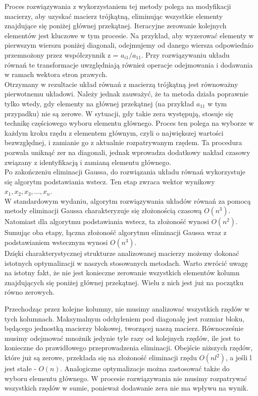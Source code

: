 \documentclass{article}
\begin{document}
	Proces rozwiązywania z wykorzystaniem tej metody polega na modyfikacji macierzy, aby uzyskać macierz trójkątną, eliminując wszystkie elementy znajdujące się poniżej głównej przekątnej. Iteracyjne zerowanie kolejnych elementów jest kluczowe w tym procesie. Na przykład, aby wyzerować elementy w pierwszym wierszu poniżej diagonali, odejmujemy od danego wiersza odpowiednio przemnożony przez współczynnik z = $a_{i1}/a_{11}$. Przy rozwiązywaniu układu równań te transformacje uwzględniają również operacje odejmowania i dodawania w ramach wektora stron prawych.\\

	Otrzymany w rezultacie układ równań z macierzą trójkątną jest równoważny pierwotnemu układowi. Należy jednak zauważyć, że ta metoda działa poprawnie tylko wtedy, gdy elementy na głównej przekątnej (na przykład $a_{11}$ w tym przypadku) nie są zerowe. W sytuacji, gdy takie zera występują, stosuje się technikę częściowego wyboru elementu głównego. Proces ten polega na wyborze w każdym kroku rzędu z elementem głównym, czyli o największej wartości bezwzględnej, i zamianie go z aktualnie rozpatrywanym rzędem. Ta procedura pozwala uniknąć zer na diagonali, jednak wprowadza dodatkowy nakład czasowy związany z identyfikacją i zamianą elementu głównego.\\

	Po zakończeniu eliminacji Gaussa, do rozwiązania układu równań wykorzystuje się algorytm podstawiania wstecz. Ten etap zwraca wektor wynikowy $x_1, x_2, x_3, ..., x_n$.\\

	W standardowym wydaniu, algorytm rozwiązywania układów równań za pomocą metody eliminacji Gaussa charakteryzuje się złożonością czasową $O(n^3)$. Natomiast dla algorytmu podstawiania wstecz, ta złożoność wynosi $O(n^2)$. Sumując oba etapy, łączna złożoność algorytmu eliminacji Gaussa wraz z podstawianiem wstecznym wynosi $O(n^3)$.\\

	Dzięki charakterystycznej strukturze analizowanej macierzy możemy dokonać istotnych optymalizacji w naszych stosowanych metodach. Warto zwrócić uwagę na istotny fakt, że nie jest konieczne zerowanie wszystkich elementów kolumn znajdujących się poniżej głównej przekątnej. Wielu z nich jest już na początku równo zerowych.

	Przechodząc przez kolejne kolumny, nie musimy analizować wszystkich rzędów w tych kolumnach. Maksymalnym odchyleniem pod diagonalę jest rozmiar bloku, będącego jednostką macierzy blokowej, tworzącej naszą macierz. Równocześnie musimy odejmować mnożnik jedynie tyle razy od kolejnych rzędów, ile jest to konieczne do prawidłowego przeprowadzenia eliminacji. Obejście niższych rzędów, które już są zerowe, przekłada się na złożoność eliminacji rzędu $O(nl^2)$, a jeśli l jest stałe - $O(n)$. Analogiczne optymalizacje można zastosować także do wyboru elementu głównego. W procesie rozwiązywania nie musimy rozpatrywać wszystkich rzędów w sumie, ponieważ dodawanie zera nie ma wpływu na wynik.
\end{document}
